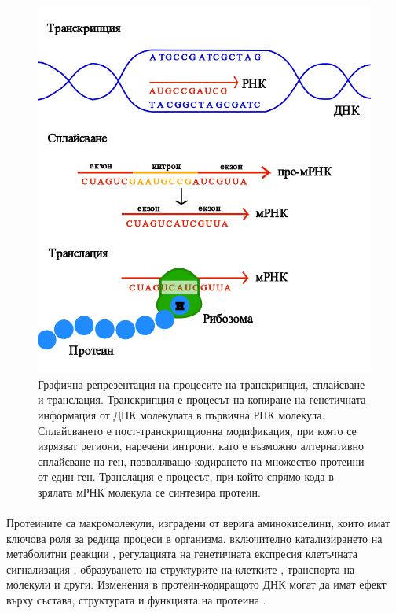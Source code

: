 \documentclass[pdftex,cyrillic,14pt,a4page,twoside,openright]{extreport}
\begin{document}
\begin{figure}[htp]
  \centering
  \includegraphics[width=12cm]{figures/transcription_splicing_translation}
  \caption {Графична репрезентация на процесите на транскрипция, сплайсване и транслация. Транскрипция е процесът на копиране на генетичната информация от ДНК молекулата в първична РНК молекула. Сплайсването е пост-транскрипционна модификация, при която се изрязват региони, наречени интрони, като е възможно алтернативно сплайсване на ген, позволяващо кодирането на множество протеини от един ген. Транслация е процесът, при който спрямо кода в зрялата мРНК молекула се синтезира протеин.}
  \label{fig:transcription_splicing_translation}
\end{figure}

\paragraph{}
Протеините са макромолекули, изградени от верига аминокиселини, които имат ключова роля за редица процеси в организма, включително катализирането на метаболитни реакции \cite{berg2002}, регулацията на генетичната експресия \cite{hinnebusch2005} клетъчната сигнализация \cite{calderwood2007}, образуването на структурите на клетките \cite{erickson2007}, транспорта на молекули \cite{wittenberg2007} и други. Изменения в протеин-кодиращото ДНК могат да имат ефект върху състава, структурата и функцията на протеина \cite{vihinen2021}.
\end{document}
